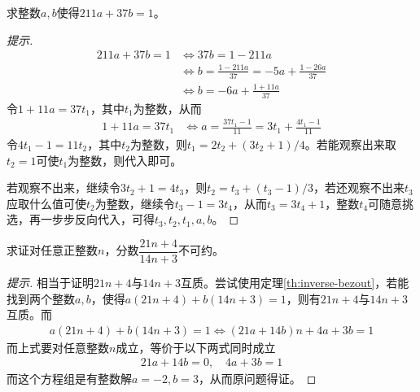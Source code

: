 \begin{example}
  求整数$a,b$使得$211a+37b=1$。
\end{example}
\begin{proof}[提示]
\begin{align*}
  211a+37b=1 &\iff 37b=1-211a \\
             &\iff b=\frac{1-211a}{37}=-5a+\frac{1-26a}{37}\\
             &\iff b=-6a+\frac{1+11a}{37} 
\end{align*}
令$1+11a=37t_1$，其中$t_1$为整数，从而
\begin{align*}
  1+11a=37t_1 & \iff a=\frac{37t_1-1}{11}=3t_1 + \frac{4t_1-1}{11}
\end{align*}
令$4t_1-1=11t_2$，其中$t_2$为整数，则$t_1=2t_2+(3t_2+1)/4$。若能观察出来取$t_2=1$可使$t_1$为整数，则代入即可。

若观察不出来，继续令$3t_2+1=4t_3$，则$t_2=t_3+(t_3-1)/3$，若还观察不出来$t_3$应取什么值可使$t_2$为整数，继续令$t_3-1=3t_4$，从而$t_3=3t_4+1$，整数$t_4$可随意挑选，再一步步反向代入，可得$t_3,t_2,t_1,a,b$。
\end{proof}



\begin{example}[1959 IMO]
  求证对任意正整数$n$，分数$\dfrac{21n+4}{14n+3}$不可约。
\end{example}
\begin{proof}[提示]
  相当于证明$21n+4$与$14n+3$互质。尝试使用定理\ref{th:inverse-bezout}，若能找到两个整数$a,b$，使得$a(21n+4)+b(14n+3)=1$，则有$21n+4$与$14n+3$互质。而
  \begin{align*}
    a(21n+4)+b(14n+3)=1 \iff (21a + 14b)n + 4a + 3b = 1
  \end{align*}
  而上式要对任意整数$n$成立，等价于以下两式同时成立
  \begin{align*}
    21a+14b=0, \quad 4a+3b=1
  \end{align*}
  而这个方程组是有整数解$a=-2, b=3$，从而原问题得证。
\end{proof}

